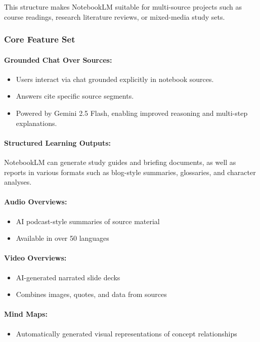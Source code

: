 \documentclass[12pt, a4paper, oneside]{report}
\begin{document}
This structure makes NotebookLM suitable for multi-source projects such as course readings, research literature reviews, or mixed-media study sets.

\subsubsection{Core Feature Set}

\paragraph{Grounded Chat Over Sources:}
\begin{itemize}[noitemsep]
  \item Users interact via chat grounded explicitly in notebook sources.
  \item Answers cite specific source segments.
  \item Powered by Gemini 2.5 Flash, enabling improved reasoning and multi-step explanations.
\end{itemize}

\paragraph{Structured Learning Outputs:}
NotebookLM can generate study guides and briefing documents, as well as reports in various formats such as blog-style summaries, glossaries, and character analyses.

\paragraph{Audio Overviews:}
\begin{itemize}[noitemsep]
  \item AI podcast-style summaries of source material
  \item Available in over 50 languages
\end{itemize}
\newpage

\paragraph{Video Overviews:}
\begin{itemize}[noitemsep]
  \item AI-generated narrated slide decks
  \item Combines images, quotes, and data from sources
\end{itemize}

\paragraph{Mind Maps:}
\begin{itemize}[noitemsep]
  \item Automatically generated visual representations of concept relationships
\end{itemize}
\end{document}
